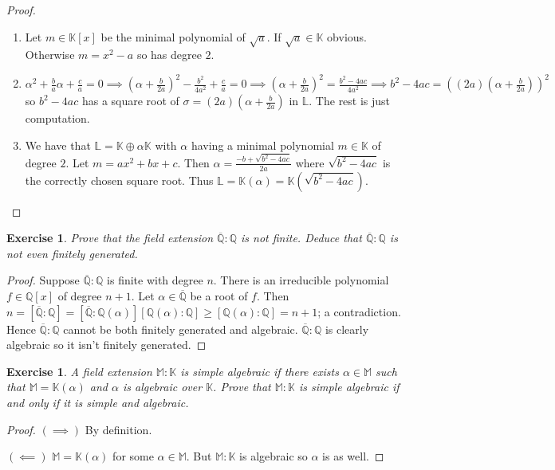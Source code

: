 \documentclass{article}
\newtheorem{exercise}[theorem]{Exercise}
\begin{document}
\begin{proof}
\begin{enumerate}[label=(\roman*)]
    \item Let $m\in \mathbb{K}[x]$ be the minimal polynomial of $\sqrt{a}$. If $\sqrt{a}\in\mathbb{K}$ obvious. Otherwise $m=x^2-a$ so has degree $2$.
    \item $\alpha^2+\frac{b}{a}\alpha+\frac{c}{a}=0\implies (\alpha+\frac{b}{2a})^2-\frac{b^2}{4a^2}+\frac{c}{a}=0\implies (\alpha+\frac{b}{2a})^2=\frac{b^2-4ac}{4a^2}\implies b^2-4ac=((2a)(\alpha+\frac{b}{2a}))^2$ so $b^2-4ac$ has a square root of $\sigma=(2a)(\alpha+\frac{b}{2a})$ in $\mathbb{L}$. The rest is just computation.
    \item We have that $\mathbb{L}=\mathbb{K}\oplus\alpha\mathbb{K}$ with $\alpha$ having a minimal polynomial $m\in\mathbb{K}$ of degree $2$. Let $m=ax^2+bx+c$. Then $\alpha=\frac{-b+\sqrt{b^2-4ac}}{2a}$ where $\sqrt{b^2-4ac}$ is the correctly chosen square root. Thus $\mathbb{L}=\mathbb{K}(\alpha)=\mathbb{K}(\sqrt{b^2-4ac})$.
\end{enumerate}
\end{proof}

\begin{exercise}
Prove that the field extension $\overline{\mathbb{Q}}:\mathbb{Q}$ is not finite. Deduce that $\overline{\mathbb{Q}}:\mathbb{Q}$ is not even finitely generated.
\end{exercise}
\begin{proof}
Suppose $\overline{\mathbb{Q}}:\mathbb{Q}$ is finite with degree $n$. There is an irreducible polynomial $f\in\mathbb{Q}[x]$ of degree $n+1$. Let $\alpha\in\overline{\mathbb{Q}}$ be a root of $f$. Then $n=[\overline{\mathbb{Q}}:\mathbb{Q}]=[\overline{\mathbb{Q}}:\mathbb{Q}(\alpha)][\mathbb{Q}(\alpha):\mathbb{Q}]\geq [\mathbb{Q}(\alpha):\mathbb{Q}]=n+1$; a contradiction. Hence $\overline{\mathbb{Q}}:\mathbb{Q}$ cannot be both finitely generated and algebraic. $\overline{\mathbb{Q}}:\mathbb{Q}$ is clearly algebraic so it isn't finitely generated.
\end{proof}

\begin{exercise}
A field extension $\mathbb{M}:\mathbb{K}$ is simple algebraic if there exists $\alpha\in \mathbb{M}$ such that $\mathbb{M}=\mathbb{K}(\alpha)$ and $\alpha$ is algebraic over $\mathbb{K}$. Prove that $\mathbb{M}:\mathbb{K}$ is simple algebraic if and only if it is simple and algebraic.
\end{exercise}
\begin{proof}
$(\implies)$ By definition.

$(\impliedby)$ $\mathbb{M}=\mathbb{K}(\alpha)$ for some $\alpha\in\mathbb{M}$. But $\mathbb{M}:\mathbb{K}$ is algebraic so $\alpha$ is as well.
\end{proof}
\end{document}
